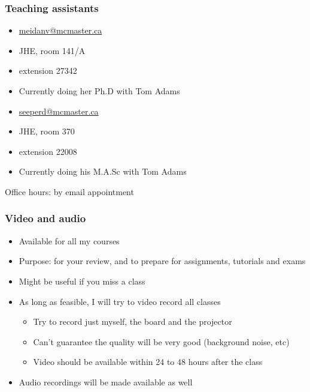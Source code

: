 \begin{frame}\frametitle{Teaching assistants}
	\vspace{12pt}
	{\color{myGreen}{Vida Meidanshahi}}
	\begin{itemize}
		\item	\url{meidanv@mcmaster.ca}
		\item	JHE, room 141/A
		\item	extension 27342
		\item	Currently doing her Ph.D with Tom Adams
	\end{itemize}
	
	\vspace{24pt}
	
	{\color{myGreen}{Dominik Seepersad}}
	\begin{itemize}
		\item	\url{seeperd@mcmaster.ca}
		\item	JHE, room 370
		\item	extension 22008
		\item	Currently doing his M.A.Sc with Tom Adams
	\end{itemize}
	\vspace{24pt}
	Office hours: by email appointment
\end{frame}

\begin{frame}\frametitle{Video and audio}
	\begin{itemize}
		\item	Available for all my courses
		\item	Purpose: for your review, and to prepare for assignments, tutorials and exams 
		\item	Might be useful if you miss a class
		\item	As long as feasible, I will try to video record all classes
		\begin{itemize}
			\item	Try to record just myself, the board and the projector 
			\item	Can't guarantee the quality will be very good (background noise, etc) 
			\item	Video should be available within 24 to 48 hours after the class 
		\end{itemize}
		\item	Audio recordings will be made available as well 
	\end{itemize}
\end{frame}


